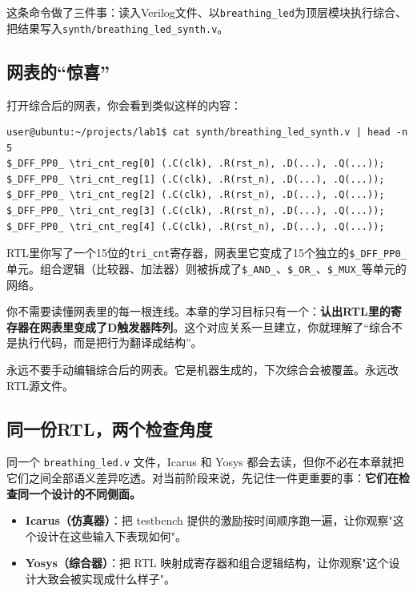 \documentclass[11pt,a4paper]{article}
\begin{document}
这条命令做了三件事：读入Verilog文件、以\texttt{breathing\_led}为顶层模块执行综合、把结果写入\texttt{synth/breathing\_led\_synth.v}。

\subsection{网表的``惊喜''}

打开综合后的网表，你会看到类似这样的内容：

\begin{lstlisting}[style=shell]
user@ubuntu:~/projects/lab1$ cat synth/breathing_led_synth.v | head -n 5
$_DFF_PP0_ \tri_cnt_reg[0] (.C(clk), .R(rst_n), .D(...), .Q(...));
$_DFF_PP0_ \tri_cnt_reg[1] (.C(clk), .R(rst_n), .D(...), .Q(...));
$_DFF_PP0_ \tri_cnt_reg[2] (.C(clk), .R(rst_n), .D(...), .Q(...));
$_DFF_PP0_ \tri_cnt_reg[3] (.C(clk), .R(rst_n), .D(...), .Q(...));
$_DFF_PP0_ \tri_cnt_reg[4] (.C(clk), .R(rst_n), .D(...), .Q(...));
\end{lstlisting}

RTL里你写了一个15位的\texttt{tri\_cnt}寄存器，网表里它变成了15个独立的\texttt{\$\_DFF\_PP0\_}单元。组合逻辑（比较器、加法器）则被拆成了\texttt{\$\_AND\_}、\texttt{\$\_OR\_}、\texttt{\$\_MUX\_}等单元的网络。

\begin{tipbox}
你不需要读懂网表里的每一根连线。本章的学习目标只有一个：\textbf{认出RTL里的寄存器在网表里变成了D触发器阵列}。这个对应关系一旦建立，你就理解了``综合不是执行代码，而是把行为翻译成结构''。
\end{tipbox}

\begin{warnbox}
永远不要手动编辑综合后的网表。它是机器生成的，下次综合会被覆盖。永远改RTL源文件。
\end{warnbox}

\subsection{同一份RTL，两个检查角度}

同一个 \texttt{breathing\_led.v} 文件，Icarus 和 Yosys 都会去读，但你不必在本章就把它们之间全部语义差异吃透。对当前阶段来说，先记住一件更重要的事：\textbf{它们在检查同一个设计的不同侧面。}

\begin{itemize}
  \item \textbf{Icarus（仿真器）}：把 testbench 提供的激励按时间顺序跑一遍，让你观察"这个设计在这些输入下表现如何"。
  \item \textbf{Yosys（综合器）}：把 RTL 映射成寄存器和组合逻辑结构，让你观察"这个设计大致会被实现成什么样子"。
\end{itemize}
\end{document}
